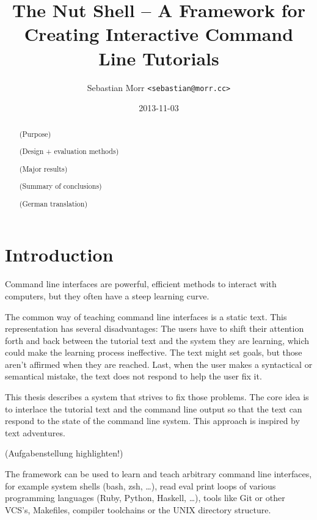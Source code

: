 \documentclass[paper=a4,abstract=on,cleardoublepage=empty,numbers=noenddot,toc=bib]{scrreprt}
\title{The Nut Shell -- A Framework for Creating Interactive Command Line Tutorials}
\author{Sebastian Morr \texttt{<sebastian@morr.cc>}}
\date{2013-11-03}
\begin{document}
\maketitle
\restoregeometry


\begin{abstract}

    \blindtext

    (Purpose)

    (Design + evaluation methods)

    (Major results)

    (Summary of conclusions)
\end{abstract}

%
\begin{abstract}
    \blindtext

    (German translation)
\end{abstract}
%

\setcounter{tocdepth}{2}
\tableofcontents


\chapter{Introduction}

Command line interfaces are powerful, efficient methods to interact with computers, but they often have a steep learning curve.

The common way of teaching command line interfaces is a static text. This representation has several disadvantages: The users have to shift their attention forth and back between the tutorial text and the system they are learning, which could make the learning process ineffective. The text might set goals, but those aren't affirmed when they are reached. Last, when the user makes a syntactical or semantical mistake, the text does not respond to help the user fix it.

This thesis describes a system that strives to fix those problems. The core idea is to interlace the tutorial text and the command line output so that the text can respond to the state of the command line system. This approach is inspired by text adventures.

(Aufgabenstellung highlighten!)

The framework can be used to learn and teach arbitrary command line interfaces, for example system shells (bash, zsh, …), read eval print loops of various programming languages (Ruby, Python, Haskell, …), tools like Git or other VCS's, Makefiles, compiler toolchains or the UNIX directory structure.
\end{document}
